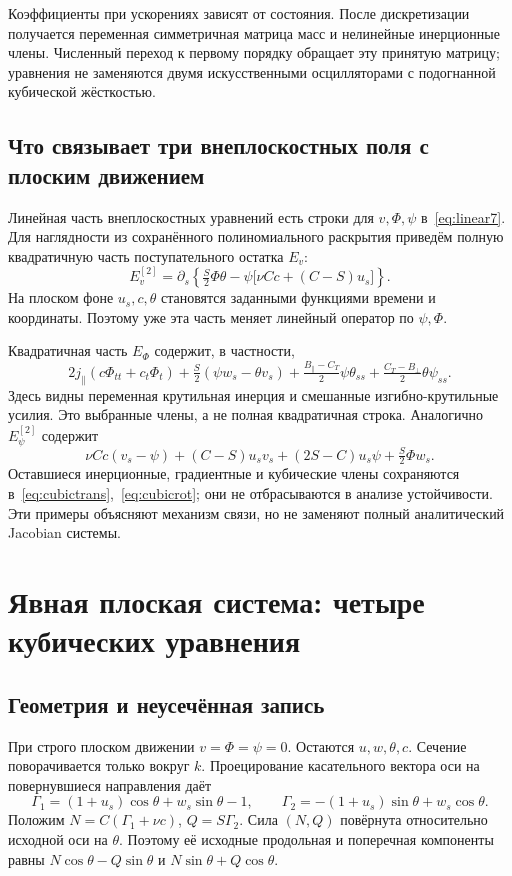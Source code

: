\documentclass[11pt,a4paper]{article}
\begin{document}
Коэффициенты при ускорениях зависят от состояния. После дискретизации получается переменная симметричная матрица масс и нелинейные инерционные члены. Численный переход к первому порядку обращает эту принятую матрицу; уравнения не заменяются двумя искусственными осцилляторами с подогнанной кубической жёсткостью.

\subsection{Что связывает три внеплоскостных поля с плоским движением}
Линейная часть внеплоскостных уравнений есть строки для $v,\Phi,\psi$ в~\eqref{eq:linear7}. Для наглядности из сохранённого полиномиального раскрытия приведём полную квадратичную часть поступательного остатка $E_v$:
\[
E_v^{[2]}=\partial_s\left\{\tfrac S2\Phi\theta
-\psi\bigl[\nu Cc+(C-S)u_s\bigr]\right\}.
\]
На плоском фоне $u_s,c,\theta$ становятся заданными функциями времени и координаты. Поэтому уже эта часть меняет линейный оператор по $\psi,\Phi$.

Квадратичная часть $E_\Phi$ содержит, в частности,
\[
2j_\parallel(c\Phi_{tt}+c_t\Phi_t)
+\tfrac S2(\psi w_s-\theta v_s)
+\tfrac{B_\parallel-C_T}{2}\psi\theta_{ss}
+\tfrac{C_T-B_\perp}{2}\theta\psi_{ss}.
\]
Здесь видны переменная крутильная инерция и смешанные изгибно-крутильные усилия. Это выбранные члены, а не полная квадратичная строка. Аналогично $E_\psi^{[2]}$ содержит
\[
\nu Cc(v_s-\psi)+(C-S)u_s v_s+(2S-C)u_s\psi
+\tfrac S2\Phi w_s.
\]
Оставшиеся инерционные, градиентные и кубические члены сохраняются в~\eqref{eq:cubictrans},~\eqref{eq:cubicrot}; они не отбрасываются в анализе устойчивости. Эти примеры объясняют механизм связи, но не заменяют полный аналитический Jacobian системы.

\section{Явная плоская система: четыре кубических уравнения}
\subsection{Геометрия и неусечённая запись}
При строго плоском движении $v=\Phi=\psi=0$. Остаются $u,w,\theta,c$. Сечение поворачивается только вокруг $k$. Проецирование касательного вектора оси на повернувшиеся направления даёт
\[
\Gamma_1=(1+u_s)\cos\theta+w_s\sin\theta-1,
\qquad
\Gamma_2=-(1+u_s)\sin\theta+w_s\cos\theta.
\]
Положим $N=C(\Gamma_1+\nu c)$, $Q=S\Gamma_2$. Сила $(N,Q)$ повёрнута относительно исходной оси на $\theta$. Поэтому её исходные продольная и поперечная компоненты равны $N\cos\theta-Q\sin\theta$ и $N\sin\theta+Q\cos\theta$.
\end{document}
